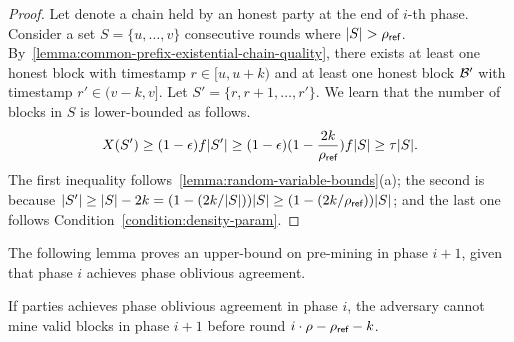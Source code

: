 \begin{proof}
    Let \chain denote a chain held by an honest party \party at the end of $i$-th phase.
    Consider a set $S = \{u, \ldots ,v\}$ consecutive rounds where $|S| > \rho_{\textsf{ref}}$.
    By~\cref{lemma:common-prefix-existential-chain-quality}, there exists at least one honest block \block with timestamp $r \in [u, u + k)$ and at least one honest block $\mathcal{B}'$ with timestamp $r' \in (v - k, v]$.
    Let $S' = \{r, r + 1, \ldots, r' \}$.
    We learn that the number of blocks in $S$ is lower-bounded as follows.
    \[ X(S') \ge (1 - \epsilon) f |S'| \ge (1 - \epsilon)(1 - \frac{2k}{\rho_{\textsf{ref}}}) f |S| \ge \tau |S|. \]
    The first inequality follows~\cref{lemma:random-variable-bounds}(a); the second is because $|S'| \ge |S| - 2k = (1 - (2k / |S|))|S| \ge (1 - (2k / \rho_{\textsf{ref}}))|S|$; and the last one follows Condition~\eqref{condition:density-param}.
\end{proof}

The following lemma proves an upper-bound on pre-mining in phase $i + 1$, given that phase $i$ achieves phase oblivious agreement.

\begin{lemma}
    If parties achieves phase oblivious agreement in phase $i$, the adversary cannot mine valid blocks in phase $i + 1$ before round $i \cdot \rho - \rho_{\textsf{ref}} - k$.
\end{lemma}

